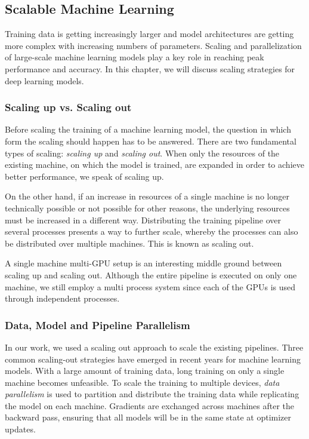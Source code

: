 \subsection{Scalable Machine Learning}

Training data is getting increasingly larger and model architectures are getting more complex with increasing numbers 
of parameters. Scaling and parallelization of large-scale machine learning models play a key role in reaching peak 
performance and accuracy. In this chapter, we will discuss scaling strategies for deep learning models. 

\subsubsection{Scaling up vs. Scaling out}

Before scaling the training of a machine learning model, the question in which form the scaling should happen has to 
be answered. There are two fundamental types of scaling: \textit{scaling up} and \textit{scaling out}. When only the resources of the 
existing machine, on which the model is trained, are expanded in order to achieve better performance, we speak of 
scaling up.

On the other hand, if an increase in resources of a single machine is no longer technically possible or not possible for 
other reasons, the underlying resources must be increased in a different way. Distributing the training pipeline over 
several processes presents a way to further scale, whereby the processes can also be distributed over multiple machines. 
This is known as scaling out. 

A single machine multi-GPU setup is an interesting middle ground between scaling up and scaling out. Although the entire 
pipeline is executed on only one machine, we still employ a multi process system since each of the GPUs is used through 
independent processes.

\subsubsection{Data, Model and Pipeline Parallelism}

In our work, we used a scaling out approach to scale the existing pipelines. Three common scaling-out strategies have emerged 
in recent years for machine learning models. With a large amount of training data, long training on only a single 
machine becomes unfeasible. To scale the training to multiple devices, \textit{data parallelism} is used to partition and distribute 
the training data while replicating the model on each machine. Gradients are exchanged across machines after the backward 
pass, ensuring that all models will be in the same state at optimizer updates. 

